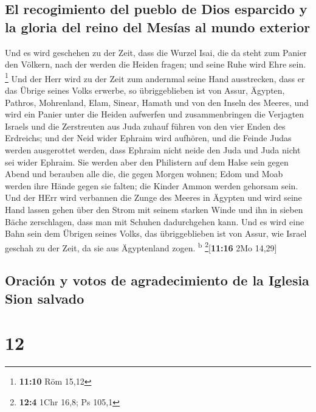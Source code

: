 \hypertarget{el-recogimiento-del-pueblo-de-dios-esparcido-y-la-gloria-del-reino-del-mesuxedas-al-mundo-exterior}{%
\subsection{El recogimiento del pueblo de Dios esparcido y la gloria del
reino del Mesías al mundo
exterior}\label{el-recogimiento-del-pueblo-de-dios-esparcido-y-la-gloria-del-reino-del-mesuxedas-al-mundo-exterior}}

 Und es wird geschehen zu der Zeit, dass die Wurzel Isai,
die da steht zum Panier den Völkern, nach der werden die Heiden fragen;
und seine Ruhe wird Ehre sein. \footnote{\textbf{11:10} Röm 15,12}
 Und der Herr wird zu der Zeit zum andernmal seine Hand
ausstrecken, dass er das Übrige seines Volks erwerbe, so übriggeblieben
ist von Assur, Ägypten, Pathros, Mohrenland, Elam, Sinear, Hamath und
von den Inseln des Meeres,  und wird ein Panier unter die
Heiden aufwerfen und zusammenbringen die Verjagten Israels und die
Zerstreuten aus Juda zuhauf führen von den vier Enden des Erdreichs;
 und der Neid wider Ephraim wird aufhören, und die Feinde
Judas werden ausgerottet werden, dass Ephraim nicht neide den Juda und
Juda nicht sei wider Ephraim.  Sie werden aber den
Philistern auf dem Halse sein gegen Abend und berauben alle die, die
gegen Morgen wohnen; Edom und Moab werden ihre Hände gegen sie falten;
die Kinder Ammon werden gehorsam sein.  Und der HErr wird
verbannen die Zunge des Meeres in Ägypten und wird seine Hand lassen
gehen über den Strom mit seinem starken Winde und ihn in sieben Bäche
zerschlagen, dass man mit Schuhen dadurchgehen kann.  Und
es wird eine Bahn sein dem Übrigen seines Volks, das übriggeblieben ist
von Assur, wie Israel geschah zu der Zeit, da sie aus Ägyptenland zogen.
\textsuperscript{b} \footnote{\textbf{12:4} 1Chr 16,8; Ps 105,1}{[}\textbf{11:16}
2Mo 14,29{]}

\hypertarget{oraciuxf3n-y-votos-de-agradecimiento-de-la-iglesia-sion-salvado}{%
\subsection{Oración y votos de agradecimiento de la Iglesia Sion
salvado}\label{oraciuxf3n-y-votos-de-agradecimiento-de-la-iglesia-sion-salvado}}

\hypertarget{section-11}{%
\section{12}\label{section-11}}

